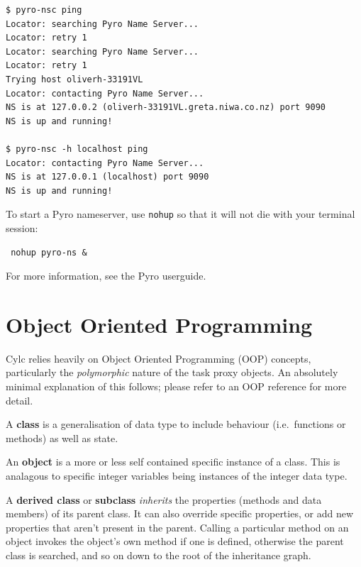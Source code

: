 \documentclass[11pt,a4paper]{article}
\begin{document}
\lstset{language=bash}

\begin{lstlisting}
$ pyro-nsc ping
Locator: searching Pyro Name Server...
Locator: retry 1
Locator: searching Pyro Name Server...
Locator: retry 1
Trying host oliverh-33191VL
Locator: contacting Pyro Name Server...
NS is at 127.0.0.2 (oliverh-33191VL.greta.niwa.co.nz) port 9090
NS is up and running!

$ pyro-nsc -h localhost ping
Locator: contacting Pyro Name Server...
NS is at 127.0.0.1 (localhost) port 9090
NS is up and running!
\end{lstlisting}

To start a Pyro nameserver, use \lstinline{nohup} so that it
will not die with your terminal session: 

\begin{lstlisting}
 nohup pyro-ns &
\end{lstlisting}

For more information, see the Pyro userguide.


\pagebreak
\section{Object Oriented Programming}
\label{ObjectOrientedProgramming}

Cylc relies heavily on Object Oriented Programming (OOP) concepts,
particularly the {\em polymorphic} nature of the task proxy objects.
An absolutely minimal explanation of this follows; 
please refer to an OOP reference for more detail.

A {\bf class} is a generalisation of data type to include behaviour
(i.e.\ functions or methods) as well as state. 


An {\bf object} is a more or less self contained specific instance
of a class. This is analagous to specific integer variables being 
instances of the integer data type.

A {\bf derived class} or {\bf subclass} {\em inherits} the properties
(methods and data members) of its parent class. It can also override
specific properties, or add new properties that aren't present in the
parent. Calling a particular method on an object invokes the object's
own method if one is defined, otherwise the parent class is searched,
and so on down to the root of the inheritance graph. 
\end{document}
